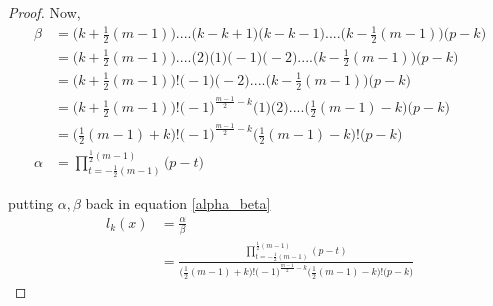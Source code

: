 \documentclass{article}
\begin{document}
\begin{proof}
Now,
\begin{equation*}
\begin{split}
    \beta   &= \big(
                k + \frac{1}{2}(m-1)
                \big)
                ....
                \big(
                k - k + 1
                \big)
                \big(
                k  - k -1
                \big)
                ....
                \big(
                k  - \frac{1}{2}(m-1)
                \big)
                \big(p-k\big)
    \\
         &= \big(
                k + \frac{1}{2}(m-1)
                \big)
                ....
                \big(  2  \big)
                \big(  1  \big)
                \big( -1  \big)
                \big( -2  \big)
                ....
                \big(
                k  - \frac{1}{2}(m-1)
                \big)
                \big(p-k\big)
    \\
         &= \Big( k + \frac{1}{2}(m-1) \Big)! 
                \big( -1  \big)
                \big( -2  \big)
                ....
                \big(
                k  - \frac{1}{2}(m-1)
                \big)
                \big(p-k\big)
    \\
         &= \Big( k + \frac{1}{2}(m-1) \Big)! 
            \Big(  -1  \Big)^{\frac{m-1}{2}-k}    
                \big( 1  \big)
                \big( 2  \big)
                ....
                \big(
                \frac{1}{2}(m-1) -k
                \big)
                \big(p-k\big)
    \\
         &= \Big( \frac{1}{2}(m-1) +k \Big)! 
            \Big(  -1  \Big)^{\frac{m-1}{2}-k}    
            \Big( \frac{1}{2}(m-1) -k \Big)! 
            \Big( p - k \Big)
    \\
\alpha  &=   \prod_{t = -\frac{1}{2}(m-1) }^{\frac{1}{2}(m-1)}  \Big(p-t\Big)
\end{split}
\end{equation*}

putting $\alpha , \beta$ back in equation \ref{alpha_beta}
\begin{equation*}
\begin{split}
l_k(x) &= 
\frac{ \alpha }{ \beta } 
\\
&=
\frac{\prod_{t = -\frac{1}{2}(m-1) }^{\frac{1}{2}(m-1)}  (p-t)}{
\Big( \frac{1}{2}(m-1) +k \Big)! 
\Big(  -1  \Big)^{\frac{m-1}{2}-k}    
\Big( \frac{1}{2}(m-1) -k \Big)! 
\Big( p - k \Big)
}
\end{split}
\end{equation*}


\end{proof}
\end{document}
